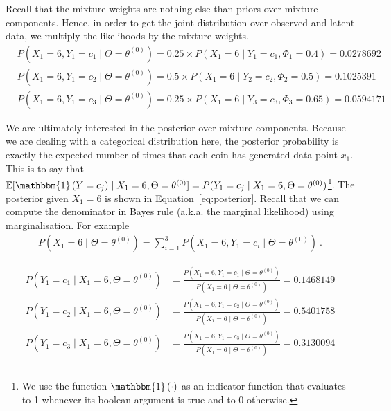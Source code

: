 \documentclass[a4paper,11pt,leqno]{report}\usepackage[]{graphicx}\usepackage[]{color}
\newcommand{\E}{\mathbb{E}}
\newcommand{\id}[1]{\mathbbm{1}\left(#1\right)}
\begin{document}
Recall that the mixture weights are nothing else than priors over mixture components. Hence, in order to get the joint distribution over observed and
latent data, we multiply the likelihoods by the mixture weights.
\begin{align}
&P(X_{1}=6,Y_{1} = c_{1}\mid \Theta=\theta^{(0)}) = 0.25 \times P(X_{1}=6 \mid Y_{1}=c_{1},\Phi_{1} = 0.4) = 0.0278692 \\
&P(X_{1}=6,Y_{1} = c_{2}\mid \Theta=\theta^{(0)}) = 0.5 \times P(X_{1}=6 \mid Y_{2}=c_{2},\Phi_{2} = 0.5) = 0.1025391 \nonumber \\ 
&P(X_{1}=6,Y_{1} = c_{3}\mid \Theta=\theta^{(0)}) = 0.25 \times P(X_{1}=6 \mid Y_{3}=c_{3},\Phi_{3} = 0.65) = 0.0594171 \nonumber
\end{align}

We are ultimately interested in the posterior over mixture components. Because we are dealing with a categorical
distribution here, the posterior probability is exactly the expected
number of times that each coin has generated data point $ x_{1} $. This is to say that
$\E[\id{Y=c_{j}}\mid X_{1}=6, \Theta = \theta^{(0)}] = P(Y_{1}=c_{j} \mid X_{1}=6, \Theta=\theta^{(0)}) $\footnote{We use
the function $ \id{\cdot} $ as an indicator function that evaluates to 1 whenever its boolean argument is true and to 0 otherwise.}. The
posterior given $ X_{1}=6 $ is shown in Equation~\eqref{eq:posterior}. Recall that we can compute the denominator in Bayes rule (a.k.a.
the marginal likelihood) using marginalisation. For example
\begin{align*}
P(X_1 = 6 \mid \Theta= \theta^{(0)}) = \sum_{i=1}^{3} P(X_{1}=6,Y_{1} = c_{i} \mid \Theta= \theta^{(0)}) \ .
\end{align*} 

\begin{align}\label{eq:posterior}
P(Y_{1} = c_{1} \mid X_{1}=6,\Theta= \theta^{(0)}) &= \frac{P(X_{1}=6,Y_{1} = c_{1} \mid \Theta= \theta^{(0)})}{P(X_1 = 6 \mid \Theta= \theta^{(0)})} = 0.1468149 \\
P(Y_{1} = c_{2} \mid X_{1}=6,\Theta= \theta^{(0)}) &= \frac{P(X_{1}=6,Y_{1} = c_{2} \mid \Theta= \theta^{(0)})}{P(X_1 = 6 \mid \Theta= \theta^{(0)})} = 0.5401758 \nonumber \\
P(Y_{1} = c_{3} \mid X_{1}=6,\Theta= \theta^{(0)}) &= \frac{P(X_{1}=6,Y_{1} = c_{3} \mid \Theta= \theta^{(0)})}{P(X_1 = 6 \mid \Theta= \theta^{(0)})} = 0.3130094 \nonumber
\end{align}
\end{document}
